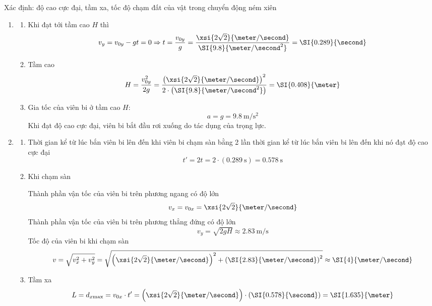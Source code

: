 \begin{dang}{Xác định: độ cao cực đại, tầm xa, tốc độ chạm đất của vật trong chuyển động ném xiên}
{\begin{enumerate}[label=\arabic*.]
\begin{itemize}
	\begin{itemize}
		\item Vận tốc của viên bi theo phương ngang:
		$$v_x=v_{0x}=\xsi{2\sqrt{2}}{\meter/\second}$$
		\item Vận tốc của viên bi theo phương thẳng đứng:
		$$v_y=v_{0y}-gt=\left(\xsi{2\sqrt{2}}{\meter/\second}\right)-\left(\SI{9.8}{\meter/\second^2}\right)\cdot\left(\SI{0.2}{\second}\right)=\SI{0.87}{\meter/\second}$$
	\end{itemize}
	\end{itemize}
\item \begin{enumerate}[label=\alph*)]
	\item Khi đạt tới tầm cao $H$ thì 
	$$v_y=v_{0y}-gt=0\Rightarrow t=\dfrac{v_{0y}}{g}=\dfrac{\xsi{2\sqrt{2}}{\meter/\second}}{\SI{9.8}{\meter/\second^2}}=\SI{0.289}{\second}$$
	\item Tầm cao 
	$$H=\dfrac{v^2_{0y}}{2g}=\dfrac{\left(\xsi{2\sqrt{2}}{\meter/\second}\right)^2}{2\cdot\left(\SI{9.8}{\meter/\second^2}\right)}=\SI{0.408}{\meter}$$
	\item Gia tốc của viên bi ở tầm cao $H$:
	$$a=g=\SI{9.8}{\meter/\second^2}$$
	Khi đạt độ cao cực đại, viên bi bắt đầu rơi xuống do tác dụng của trọng lực.
\end{enumerate}
\item \begin{enumerate}[label=\alph*)]
	\item Thời gian kể từ lúc bắn viên bi lên đến khi viên bi chạm sàn bằng 2 lần thời gian kể từ lúc bắn viên bi lên đến khi nó đạt độ cao cực đại
	$$t'=2t=2\cdot\left(\SI{0.289}{\second}\right)=\SI{0.578}{\second}$$
	\item Khi chạm sàn
	
	Thành phần vận tốc của viên bi trên phương ngang có độ lớn
	$$v_x=v_{0x}=\xsi{2\sqrt{2}}{\meter
	/\second}$$
	Thành phần vận tốc của viên bi trên phương thẳng đứng có độ lớn
	$$v_y=\sqrt{2gH}\approx\SI{2.83}{\meter/\second}$$
	Tốc độ của viên bi khi chạm sàn
	$$v=\sqrt{v^2_x+v^2_y}=\sqrt{\left(\xsi{2\sqrt{2}}{\meter/\second}\right)^2+\left(\SI{2.83}{\meter/\second}\right)^2}\approx\SI{4}{\meter/\second}$$
	\item Tầm xa 
	$$L=d_{x \text{max}}=v_{0x}\cdot t'=\left(\xsi{2\sqrt{2}}{\meter/\second}\right)\cdot\left(\SI{0.578}{\second}\right)=\SI{1.635}{\meter}$$
\end{enumerate}
\end{enumerate}
}
\end{dang}
